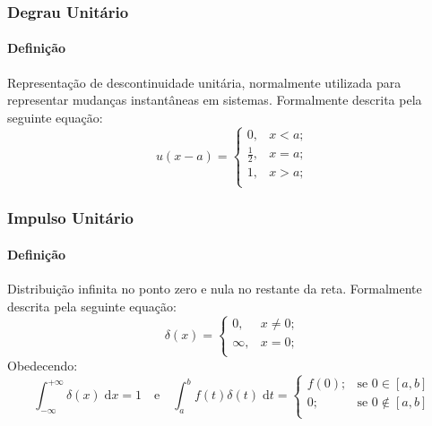 \documentclass{article}
\begin{document}
            \subsubsection{Degrau Unitário}
                \paragraph{Definição}Representação de descontinuidade unitária, normalmente utilizada para representar mudanças instantâneas em sistemas. Formalmente descrita pela seguinte equação:
                    \begin{equation}
                        \boxed{
                            u(x - a) = 
                            \begin{cases}
                                0, & x < a;\\
                                \frac{1}{2}, & x = a;\\
                                1, & x > a;\\
                            \end{cases}
                        }
                    \end{equation}

            \subsubsection{Impulso Unitário}
                \paragraph{Definição}Distribuição infinita no ponto zero e nula no restante da reta. Formalmente descrita pela seguinte equação:
                    \begin{equation}
                        \boxed{
                            \delta(x) = 
                            \begin{cases}
                                0, & x \neq 0;\\
                                \infty, & x = 0;\\
                            \end{cases}
                            }
                        \end{equation}
                Obedecendo:
                    \begin{equation*}
                        \int_{-\infty}^{+\infty} \delta(x) \; \text{d}x = 1
                        \quad\text{e}\quad
                        \boxed{
                            \int_{a}^{b} f(t) \delta(t)\;\text{d}t = 
                            \begin{cases}
                                f(0);   & \text{se } 0\in[a,b]\\
                                0;      & \text{se } 0\notin[a,b]\\
                            \end{cases}
                        }
                    \end{equation*}
\end{document}
